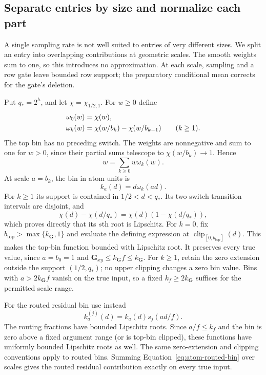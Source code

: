 \documentclass[11pt]{article}
\numberwithin{equation}{section}
\theoremstyle{definition}
\theoremstyle{remark}
\begin{document}
\subsection{Separate entries by size and normalize each part}

A single sampling rate is not well suited to entries of very different sizes. We split an entry into overlapping contributions at geometric scales. The smooth weights sum to one, so this introduces no approximation. At each scale, sampling and a row gate leave bounded row support; the preparatory conditional mean corrects for the gate's deletion.

Put $q_*=2^{h}$, and let $\chi=\chi_{1/2,1}$.  For $w\ge0$ define
\begin{align}
 \omega_0(w)&=\chi(w),\notag\\
 \omega_k(w)&=\chi(w/b_k)-\chi(w/b_{k-1})\qquad(k\ge1).
 \label{eq:atom-bin-weights}
\end{align}
The top bin has no preceding switch.  The weights are nonnegative and
sum to one for $w>0$, since their partial sums telescope to
$\chi(w/b_k)\to1$.  Hence
\begin{equation}
 w=\sum_{k\ge0}w\omega_k(w).
 \label{eq:atom-bin-partition}
\end{equation}
At scale $a=b_k$, the bin in atom units is
\begin{equation}
 k_a(d)=d\omega_k(ad).
 \label{eq:atom-bin-function}
\end{equation}
For $k\ge1$ its support is contained in $1/2<d<q_*$.
Its two switch transition intervals are disjoint, and
\[
 \chi(d)-\chi(d/q_*)=\chi(d)(1-\chi(d/q_*)),
\]
which proves directly that its $s$th root is Lipschitz.
For $k=0$, fix ${b}_{\mathrm{top}}>\max\{{k}_{\mathbf{G}},1\}$ and evaluate the defining
expression at $\operatorname{clip}_{[0,{b}_{\mathrm{top}}]}(d)$.
This makes the top-bin function bounded with Lipschitz root.  It
preserves every true value, since $a=b_0=1$ and
${\mathbf{G}}_{xy}\le {k}_{\mathbf{G}} f\le {k}_{\mathbf{G}}$.  For $k\ge1$, retain the zero extension
outside the support $(1/2,q_*)$; no upper clipping changes a zero bin
value.  Bins with $a>2{k}_{\mathbf{G}} f$ vanish on the true input, so a fixed
${k}_f\ge2{k}_{\mathbf{G}}$ suffices for the permitted scale range.

For the routed residual bin use instead
\begin{equation}
 k_a^{(j)}(d)=k_a(d)s_j(ad/f).
 \label{eq:atom-routed-bin}
\end{equation}
The routing fractions have bounded Lipschitz roots.  Since $a/f\le {k}_f$
and the bin is zero above a fixed argument range (or is top-bin clipped),
these functions have uniformly bounded Lipschitz roots as well.  The
same zero-extension and clipping conventions apply to routed bins.
Summing Equation~\eqref{eq:atom-routed-bin} over scales gives the routed
residual contribution exactly on every true input.
\end{document}
